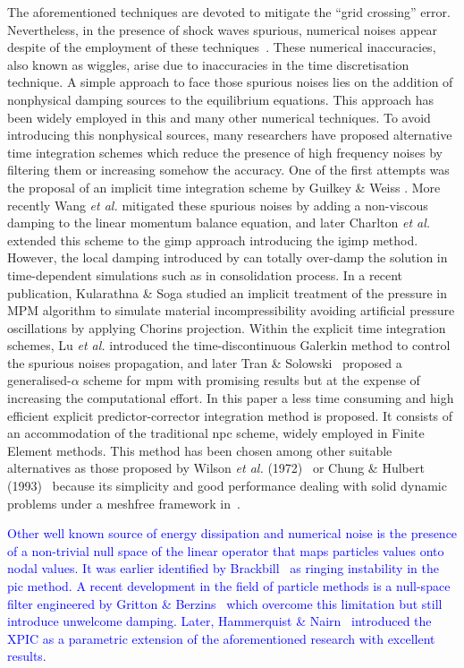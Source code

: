 \documentclass[preprint,12pt,a4paper]{elsarticle}
\newcommand{\MODIFIED}[1]{
  \textcolor{blue}{{#1}}
}
\begin{document}
The aforementioned techniques are devoted to mitigate the
``grid crossing'' error. Nevertheless, in the presence of shock waves spurious,
numerical noises appear despite of the employment of these
techniques~\cite{Tran2019e}. These numerical inaccuracies, also known
as wiggles, arise due to inaccuracies in the time discretisation technique.
A simple approach to face those spurious noises lies on the addition of nonphysical damping sources to the equilibrium equations. This
approach has been widely employed in this and many other numerical
techniques. To avoid introducing this nonphysical sources, many
researchers have proposed alternative time integration
schemes which reduce the presence of high frequency noises by
filtering them or increasing somehow the accuracy. One of the first attempts was
the proposal of an implicit time integration scheme by Guilkey \&
Weiss \cite{Guilkey_2003}. More recently Wang {\it et al.}
\cite{Wang_2016} mitigated these spurious noises by adding a non-viscous
damping to the linear momentum balance equation, and later Charlton
{\it et al.} \cite{Charlton_2017} extended this scheme to the
\acrshort{gimp} approach introducing the \acrfull{igimp}
method. However, the local damping introduced by 
\cite{Wang_2016} can totally over-damp the solution in time-dependent
simulations such as in consolidation process. In a recent publication,
Kularathna \& Soga \cite{Soga_2017} studied an implicit treatment of the pressure in MPM algorithm to simulate material incompressibility
avoiding artificial pressure oscillations by applying
Chorin\textquotesingle s
projection. Within the explicit time integration schemes, Lu {\it et al.}\cite{LU_2018} introduced the time-discontinuous Galerkin method to control the spurious noises
propagation, and later Tran \& Solowski~\cite{Tran2019e}
proposed a generalised-$\alpha$ scheme for \acrshort{mpm} with
promising results but at the expense of increasing the computational
effort. In this paper a less time consuming and high efficient explicit predictor-corrector integration method is
proposed. It consists of an accommodation of the traditional \acrfull{npc} scheme, widely employed in Finite Element methods. This method
has been chosen among other suitable alternatives as those proposed
by Wilson {\it et al.} (1972)~\cite{Wilson1972} or Chung \& Hulbert
(1993)~\cite{Geranlized_alpha_1993} because its simplicity and good
performance dealing with solid dynamic problems under a meshfree
framework in~\cite{Navas2018a}.  
\MODIFIED{ Other well known source of energy dissipation and numerical noise is the presence of a non-trivial null space of the linear operator that maps particles values onto nodal values. It was earlier identified by Brackbill~\cite{BRACKBILL1988469} as ringing instability in the \acrfull{pic} method. A recent development in the field of particle methods is a null-space filter engineered by Gritton \&
Berzins~\cite{Gritton2017} which overcome this limitation but still introduce unwelcome damping.  Later, Hammerquist \& Nairn~\cite{HAMMERQUIST2017724} introduced the XPIC as a parametric extension of the aforementioned research with excellent results.}
\end{document}
